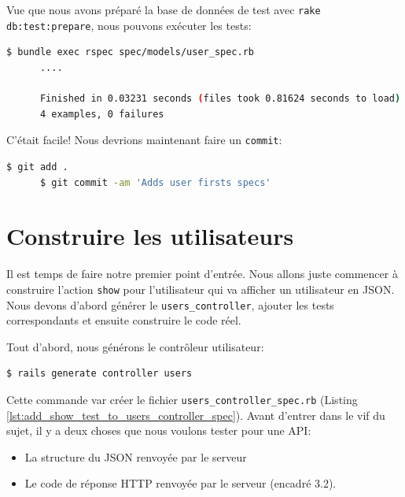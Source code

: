 \documentclass[]{report}
\begin{document}
    Vue que nous avons préparé la base de données de test avec \verb|rake db:test:prepare|, nous pouvons exécuter les tests:

    \begin{scriptsize}
      \begin{lstlisting}[language=bash]
      $ bundle exec rspec spec/models/user_spec.rb
      ....

      Finished in 0.03231 seconds (files took 0.81624 seconds to load)
      4 examples, 0 failures
      \end{lstlisting}
    \end{scriptsize}

    C'était facile! Nous devrions maintenant faire un \verb|commit|:

    \begin{scriptsize}
      \begin{lstlisting}[language=bash]
      $ git add .
      $ git commit -am 'Adds user firsts specs'
      \end{lstlisting}
    \end{scriptsize}

  \section{Construire les utilisateurs}

    Il est temps de faire notre premier point d'entrée. Nous allons juste commencer à construire l'action \verb|show| pour l'utilisateur qui va afficher un utilisateur en JSON. Nous devons d'abord générer le \verb|users_controller|, ajouter les tests correspondants et ensuite construire le code réel.

    Tout d'abord, nous générons le contrôleur utilisateur:

    \begin{scriptsize}
      \begin{lstlisting}[language=bash]
      $ rails generate controller users
      \end{lstlisting}
    \end{scriptsize}

    Cette commande var créer le fichier \verb|users_controller_spec.rb| (Listing \ref{lst:add_show_test_to_users_controller_spec}). Avant d'entrer dans le vif du sujet, il y a deux choses que nous voulons tester pour une API:

    \begin{itemize}
      \item La structure du JSON renvoyée par le serveur
      \item Le code de réponse HTTP renvoyée par le serveur (encadré 3.2).
    \end{itemize}
\end{document}
